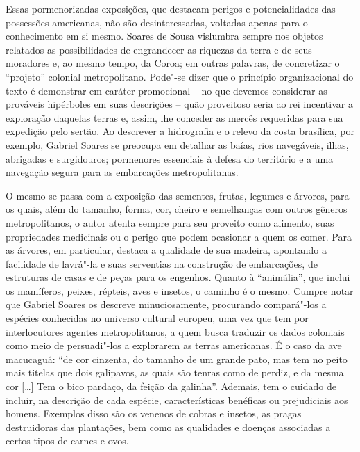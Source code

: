 Essas pormenorizadas exposições, que destacam perigos e potencialidades
das possessões americanas, não são desinteressadas, voltadas apenas
para o conhecimento em si mesmo. Soares de Sousa vislumbra sempre nos
objetos relatados as possibilidades de engrandecer as riquezas da terra
e de seus moradores e, ao mesmo tempo, da Coroa; em outras palavras, de
concretizar o “projeto” colonial metropolitano. Pode"-se dizer que o
princípio organizacional do texto é demonstrar em caráter promocional –
no que devemos considerar as prováveis hipérboles em suas descrições –
quão proveitoso seria ao rei incentivar a exploração daquelas terras e,
assim, lhe conceder as mercês requeridas para sua expedição pelo
sertão.  Ao descrever a hidrografia e o relevo da costa brasílica, por
exemplo, Gabriel Soares se preocupa em detalhar as baías, rios
navegáveis, ilhas, abrigadas e surgidouros; pormenores essenciais à
defesa do território e a uma navegação segura para as embarcações metropolitanas.

O mesmo se passa com a exposição das sementes, frutas, legumes e
árvores, para os quais, além do tamanho, forma, cor, cheiro e
semelhanças com outros gêneros metropolitanos, o autor atenta sempre
para seu proveito como alimento, suas propriedades medicinais ou o
perigo que podem ocasionar a quem os comer. Para as árvores,
em particular, destaca a qualidade de sua madeira, apontando a
facilidade de lavrá"-la e suas serventias na construção de embarcações,
de estruturas de casas e de peças para os engenhos. Quanto à
“animália”, que inclui os mamíferos, peixes, répteis, aves e insetos, o
caminho é o mesmo. Cumpre notar que Gabriel Soares os descreve
minuciosamente, procurando compará"-los a espécies conhecidas no
universo cultural europeu, uma vez que tem por interlocutores agentes
metropolitanos, a quem busca traduzir os dados coloniais como meio de
persuadi"-los a explorarem as terras americanas.  É o caso da ave
macucaguá: “de cor cinzenta, do tamanho de um grande pato, mas tem no
peito mais titelas que dois galipavos, as quais são tenras como de
perdiz, e da mesma cor [\ldots] Tem o bico pardaço, da feição da galinha”.		
Ademais, tem o cuidado de incluir, na descrição de cada espécie,
características benéficas ou prejudiciais aos homens. Exemplos disso
são os venenos de cobras e insetos, as pragas destruidoras das
plantações, bem como as qualidades e doenças associadas a certos tipos de carnes e ovos. 

